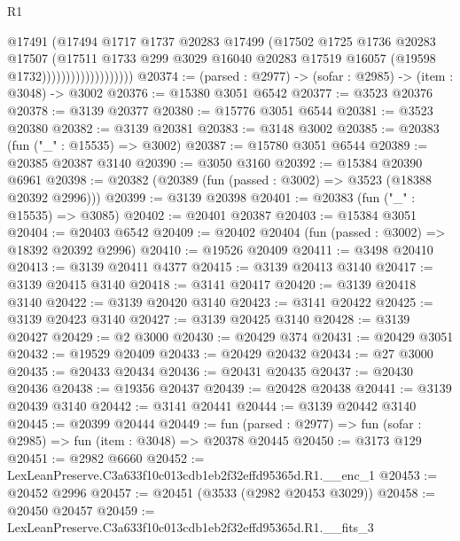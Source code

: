 \begin{lexlean}{R1}
\begin{coremodule}
                                  @17491
                                  (@17494
                                    @1717
                                    @1737
                                    @20283
                                    @17499
                                    (@17502
                                      @1725
                                      @1736
                                      @20283
                                      @17507
                                      (@17511
                                        @1733
                                        @299
                                        @3029
                                        @16040
                                        @20283
                                        @17519
                                        @16057
                                        (@19598 @1732)))))))))))))))))))
@20374 := (parsed : @2977) -> (sofar : @2985) -> (item : @3048) -> @3002
@20376 := @15380 @3051 @6542
@20377 := @3523 @20376
@20378 := @3139 @20377
@20380 := @15776 @3051 @6544
@20381 := @3523 @20380
@20382 := @3139 @20381
@20383 := @3148 @3002
@20385 := @20383 (fun ("_" : @15535) => @3002)
@20387 := @15780 @3051 @6544
@20389 := @20385 @20387 @3140
@20390 := @3050 @3160
@20392 := @15384 @20390 @6961
@20398 := @20382 (@20389 (fun (passed : @3002) => @3523 (@18388 @20392 @2996)))
@20399 := @3139 @20398
@20401 := @20383 (fun ("_" : @15535) => @3085)
@20402 := @20401 @20387
@20403 := @15384 @3051
@20404 := @20403 @6542
@20409 := @20402 @20404 (fun (passed : @3002) => @18392 @20392 @2996)
@20410 := @19526 @20409
@20411 := @3498 @20410
@20413 := @3139 @20411 @4377
@20415 := @3139 @20413 @3140
@20417 := @3139 @20415 @3140
@20418 := @3141 @20417
@20420 := @3139 @20418 @3140
@20422 := @3139 @20420 @3140
@20423 := @3141 @20422
@20425 := @3139 @20423 @3140
@20427 := @3139 @20425 @3140
@20428 := @3139 @20427
@20429 := @2 @3000
@20430 := @20429 @374
@20431 := @20429 @3051
@20432 := @19529 @20409
@20433 := @20429 @20432
@20434 := @27 @3000
@20435 := @20433 @20434
@20436 := @20431 @20435
@20437 := @20430 @20436
@20438 := @19356 @20437
@20439 := @20428 @20438
@20441 := @3139 @20439 @3140
@20442 := @3141 @20441
@20444 := @3139 @20442 @3140
@20445 := @20399 @20444
@20449 := fun (parsed : @2977) => fun (sofar : @2985) => fun (item : @3048) => @20378 @20445
@20450 := @3173 @129
@20451 := @2982 @6660
@20452 := LexLeanPreserve.C3a633f10c013cdb1eb2f32effd95365d.R1.__enc_1
@20453 := @20452 @2996
@20457 := @20451 (@3533 (@2982 @20453 @3029))
@20458 := @20450 @20457
@20459 := LexLeanPreserve.C3a633f10c013cdb1eb2f32effd95365d.R1.__fits_3

\end{coremodule}
\end{lexlean}
